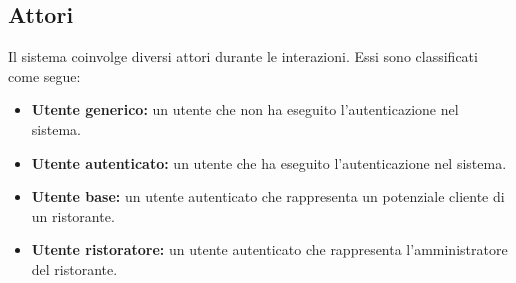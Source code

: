 \subsection{Attori}
Il sistema coinvolge diversi attori durante le interazioni.
Essi sono classificati come segue:
\begin{itemize}
	\item \textbf{Utente generico:} un utente che non ha eseguito l'autenticazione nel sistema.
	\item \textbf{Utente autenticato:} un utente che ha eseguito l'autenticazione nel sistema.
	\item \textbf{Utente base:}  un utente autenticato che rappresenta un potenziale cliente di un ristorante.
	\item \textbf{Utente ristoratore:} un utente autenticato che rappresenta l'amministratore del ristorante.
\end{itemize}
